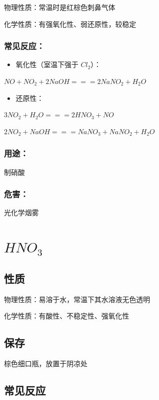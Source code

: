 \documentclass[UTF8,zihao=-4,openany]{ctexbook}
\begin{document}
物理性质：常温时是红棕色刺鼻气体\par

化学性质：有强氧化性、弱还原性，较稳定\par
\subsubsection{常见反应：}
\begin{itemize}
\item 氧化性（室温下强于 $Cl_2$）：
\end{itemize}

$NO+NO_2+2NaOH=\!=\!=2NaNO_2+H_2O$\par

\begin{itemize}
\item 还原性：
\end{itemize}

$3NO_2+H_2O=\!=\!=2HNO_3+NO$\par

$2NO_2+NaOH=\!=\!=NaNO_3+NaNO_2+H_2O$\par
\subsubsection{用途：}
制硝酸\par
\subsubsection{危害：}
光化学烟雾\par
\section{$HNO_3$}
\subsection{性质}
物理性质：易溶于水，常温下其水溶液无色透明\par

化学性质：有酸性、不稳定性、强氧化性\par
\subsection{保存}
棕色细口瓶，放置于阴凉处\par
\subsection{常见反应}
\end{document}
